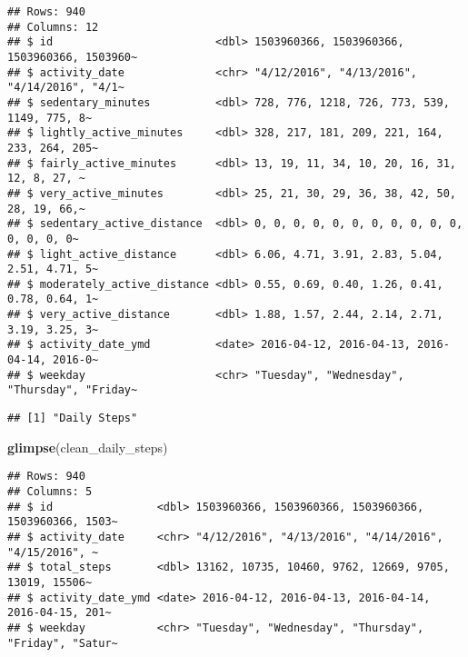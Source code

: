 \documentclass[
]{article}
\newenvironment{Shaded}{\begin{snugshade}}{\end{snugshade}}
\newcommand{\FunctionTok}[1]{\textcolor[rgb]{0.13,0.29,0.53}{\textbf{#1}}}
\newcommand{\NormalTok}[1]{#1}
\newcommand{\OtherTok}[1]{\textcolor[rgb]{0.56,0.35,0.01}{#1}}
\newcommand{\SpecialCharTok}[1]{\textcolor[rgb]{0.81,0.36,0.00}{\textbf{#1}}}
\newcommand{\StringTok}[1]{\textcolor[rgb]{0.31,0.60,0.02}{#1}}
\begin{document}
\begin{verbatim}
## Rows: 940
## Columns: 12
## $ id                         <dbl> 1503960366, 1503960366, 1503960366, 1503960~
## $ activity_date              <chr> "4/12/2016", "4/13/2016", "4/14/2016", "4/1~
## $ sedentary_minutes          <dbl> 728, 776, 1218, 726, 773, 539, 1149, 775, 8~
## $ lightly_active_minutes     <dbl> 328, 217, 181, 209, 221, 164, 233, 264, 205~
## $ fairly_active_minutes      <dbl> 13, 19, 11, 34, 10, 20, 16, 31, 12, 8, 27, ~
## $ very_active_minutes        <dbl> 25, 21, 30, 29, 36, 38, 42, 50, 28, 19, 66,~
## $ sedentary_active_distance  <dbl> 0, 0, 0, 0, 0, 0, 0, 0, 0, 0, 0, 0, 0, 0, 0~
## $ light_active_distance      <dbl> 6.06, 4.71, 3.91, 2.83, 5.04, 2.51, 4.71, 5~
## $ moderately_active_distance <dbl> 0.55, 0.69, 0.40, 1.26, 0.41, 0.78, 0.64, 1~
## $ very_active_distance       <dbl> 1.88, 1.57, 2.44, 2.14, 2.71, 3.19, 3.25, 3~
## $ activity_date_ymd          <date> 2016-04-12, 2016-04-13, 2016-04-14, 2016-0~
## $ weekday                    <chr> "Tuesday", "Wednesday", "Thursday", "Friday~
\end{verbatim}

\begin{Shaded}
\end{Shaded}

\begin{verbatim}
## [1] "Daily Steps"
\end{verbatim}

\begin{Shaded}
\begin{Highlighting}[]
\FunctionTok{glimpse}\NormalTok{(clean\_daily\_steps)}
\end{Highlighting}
\end{Shaded}

\begin{verbatim}
## Rows: 940
## Columns: 5
## $ id                <dbl> 1503960366, 1503960366, 1503960366, 1503960366, 1503~
## $ activity_date     <chr> "4/12/2016", "4/13/2016", "4/14/2016", "4/15/2016", ~
## $ total_steps       <dbl> 13162, 10735, 10460, 9762, 12669, 9705, 13019, 15506~
## $ activity_date_ymd <date> 2016-04-12, 2016-04-13, 2016-04-14, 2016-04-15, 201~
## $ weekday           <chr> "Tuesday", "Wednesday", "Thursday", "Friday", "Satur~
\end{verbatim}
\end{document}
